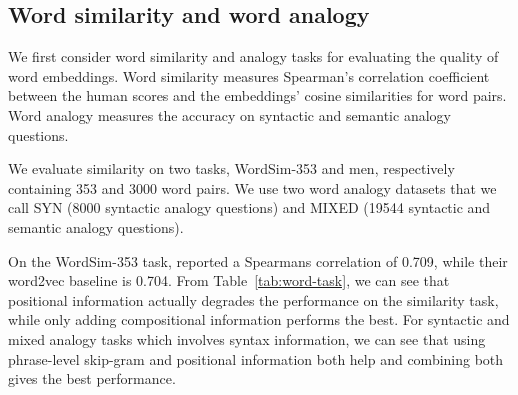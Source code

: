 \subsection{Word similarity and word analogy}
We first consider word similarity and analogy tasks for evaluating the quality of word embeddings.
Word similarity measures Spearman's correlation coefficient between the human scores
and the embeddings' cosine similarities for word pairs. Word analogy measures the accuracy on
syntactic and semantic analogy questions. 


We evaluate similarity on two tasks, WordSim-353 and men, 
respectively containing 353 and 3000 word pairs. 
We use two word analogy datasets that we call SYN (8000 syntactic analogy questions) and MIXED (19544
syntactic and semantic analogy questions).


On the WordSim-353 task,  reported a Spearmans correlation of 0.709, while their word2vec baseline is 0.704.
From Table~\ref{tab:word-task}, we can see that positional information actually degrades the performance on the similarity task, while only adding compositional information
performs the best.
For syntactic and mixed analogy tasks which involves
syntax information, we can see that using phrase-level skip-gram and positional information both help and combining both gives the best performance. 
